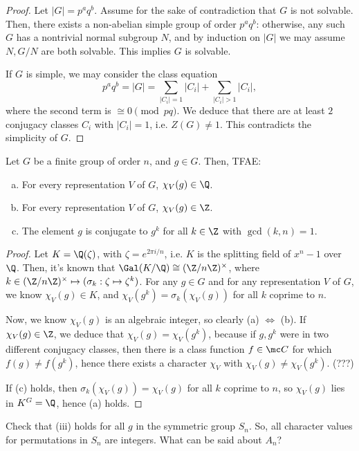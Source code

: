 \begin{proof}
Let $|G|=p^aq^b$. Assume for the sake of contradiction that $G$ is not solvable. Then, there exists a non-abelian simple group of order $p^aq^b$: otherwise, any such $G$ has a nontrivial normal subgroup $N$, and by induction on $|G|$ we may assume $N,G/N$ are both solvable. This implies $G$ is solvable.

If $G$ is simple, we may consider the class equation
$$p^aq^b=|G|=\sum_{|C_i|=1}|C_i|+\sum_{|C_i|>1}|C_i|,$$
where the second term is $\cong 0 \pmod{pq}$. We deduce that there are at least $2$ conjugacy classes $C_i$ with $|C_i|=1$, i.e. $Z(G) \neq 1$. This contradicts the simplicity of $G$.
\end{proof}

\begin{thm}
    Let $G$ be a finite group of order $n$, and $g \in G$. Then, TFAE:
    \begin{enumerate}[(a)]
        \item For every representation $V$ of $G$, $\chi_V(g) \in \Q$.
        \item For every representation $V$ of $G$, $\chi_V(g) \in \Z$.
        \item The element $g$ is conjugate to $g^k$ for all $k \in \Z$ with $\gcd (k,n)=1$.
    \end{enumerate}
\end{thm}

\begin{proof}
    Let $K = \Q(\zeta)$, with $\zeta=e^{2\pi i /n}$, i.e. $K$ is the splitting field of $x^n-1$ over $\Q$. Then, it's known that $\Gal(K/\Q) \cong (\Z/n\Z)^\times$, where $k \in (\Z/n\Z)^\times \mapsto (\sigma_k:\zeta \mapsto \zeta^k )$. For any $g \in G$ and for any representation $V$ of $G$, we know $\chi_V(g) \in K$, and $\chi_V(g^k) = \sigma_k(\chi_V(g))$ for all $k$ coprime to $n$.

    Now, we know $\chi_V(g)$ is an algebraic integer, so clearly (a) $\iff$ (b). If $\chi_V(g) \in \Z$, we deduce that $\chi_V(g) = \chi_V(g^k)$, because if $g,g^k$ were in two different conjugacy classes, then there is a class function $f \in \mc C$ for which $f(g) \neq f(g^k)$, hence there exists a character $\chi_V$ with $\chi_V(g) \neq \chi_V(g^k)$. (???)

    If (c) holds, then $\sigma_k(\chi_V(g))=\chi_V(g)$ for all $k$ coprime to $n$, so $\chi_V(g)$ lies in $K^G=\Q$, hence (a) holds.
\end{proof}

\begin{notebox*}[Exercise]
    Check that (iii) holds for all $g$ in the symmetric group $S_n$. So, all character values for permutations in $S_n$ are integers. What can be said about $A_n$?
\end{notebox*}

